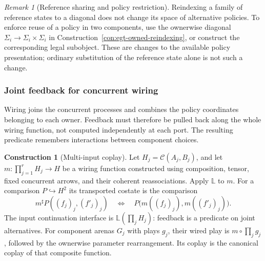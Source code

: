 \documentclass[11pt,a4paper]{article}
\numberwithin{equation}{section}
\theoremstyle{definition}
\newtheorem{construction}[construction]{Construction}
\theoremstyle{remark}
\newtheorem{remark}[theorem]{Remark}
\theoremstyle{plain}
\begin{document}
\begin{remark}[Reference sharing and policy restriction]
Reindexing a family of reference states to a diagonal does not change its
space of alternative policies. To enforce reuse of a policy in two
components, use the ownerwise diagonal
$\Sigma_i\to\Sigma_i\times\Sigma_i$ in
Construction~\ref{con:egt-owned-reindexing}, or construct the corresponding
legal subobject. These are changes to the available policy presentation;
ordinary substitution of the reference state alone is not such a change.
\end{remark}

\subsubsection{Joint feedback for concurrent wiring}

Wiring joins the concurrent processes and combines the policy
coordinates belonging to each owner. Feedback must therefore be pulled
back along the whole wiring function, not computed independently at each
port. The resulting predicate remembers interactions between component
choices.

\begin{construction}[Multi-input coplay]
\label{con:cgt-joint-feedback}
Let $H_j=\mathcal C(A_j,B_j)$, and let
$m:\prod_{j=1}^rH_j\to H$ be a wiring function constructed using
composition, tensor, fixed concurrent arrows, and their coherent
reassociations. Apply $\mathbb L$ to $m$.
For a comparison $P\hookrightarrow H^2$ its transported costate is
the comparison
\begin{equation}\label{eq:cgt-joint-feedback}
 m^\sharp P((f_j)_j,(f'_j)_j)
 \quad\Longleftrightarrow\quad
 P\bigl(m((f_j)_j),m((f'_j)_j)\bigr).
\end{equation}
The input continuation interface is
$\mathbb L(\prod_jH_j)$: feedback is a predicate on joint alternatives.
For component arenas $G_j$ with plays $g_j$, their wired play is
$m\circ\prod_jg_j$, followed by the ownerwise parameter rearrangement.
Its coplay is the canonical coplay of that composite function.
\end{construction}
\end{document}
